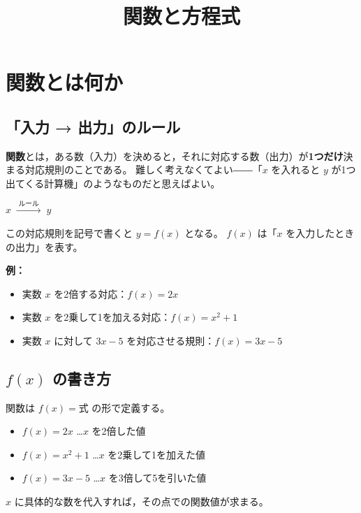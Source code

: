\documentclass[paper=a4,fleqn]{jlreq}
\title{関数と方程式}
\author{}
\date{}
\makeatletter
\newcommand{\formula}[1]{%
  \vspace{4pt}%
  \begin{center}{\large\bfseries\boldmath\(\displaystyle #1\)}\end{center}%
  \vspace{4pt}%
}
\renewcommand{\maketitle}{%
  \begin{center}
    {\large\bfseries \@title\par}
  \end{center}
  \vspace{4pt}
}
\makeatother
\begin{document}
\maketitle

\section{関数とは何か}

\subsection{「入力 → 出力」のルール}

\textbf{関数}とは，ある数（入力）を決めると，それに対応する数（出力）が\textbf{1つだけ}決まる対応規則のことである。
難しく考えなくてよい――「\(x\) を入れると \(y\) が1つ出てくる計算機」のようなものだと思えばよい。

\formula{x \;\xrightarrow{\;\text{ルール}\;}\; y}

この対応規則を記号で書くと \(y = f(x)\) となる。
\(f(x)\) は「\(x\) を入力したときの出力」を表す。

\vspace{4pt}
\textbf{例：}
\begin{itemize}
  \item 実数 \(x\) を2倍する対応：\(f(x) = 2x\)
  \item 実数 \(x\) を2乗して1を加える対応：\(f(x) = x^2 + 1\)
  \item 実数 \(x\) に対して \(3x - 5\) を対応させる規則：\(f(x) = 3x - 5\)
\end{itemize}

\subsection{\(f(x)\) の書き方}

関数は \(f(x) = \text{式}\) の形で定義する。

\begin{itemize}
  \item \(f(x) = 2x\) \quad …\(x\) を2倍した値
  \item \(f(x) = x^2 + 1\) \quad …\(x\) を2乗して1を加えた値
  \item \(f(x) = 3x - 5\) \quad …\(x\) を3倍して5を引いた値
\end{itemize}

\(x\) に具体的な数を代入すれば，その点での関数値が求まる。
\end{document}
